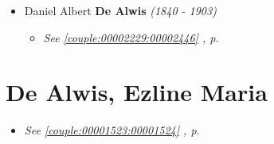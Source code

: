 \documentclass[10pt, openany]{book}
\begin{document}
\begin{itemize}
{\begin{itemize}
{\begin{itemize}
{\begin{itemize}
{\begin{itemize}
{\begin{itemize}
{\begin{itemize}
{\begin{itemize}
{\begin{itemize}
\end{itemize}
  }
\item{Sunil \textbf{De Livera} \textcolor{gray}{\textit{(b. 195?)}}
  }
\item{Jagath Manjula \textbf{De Livera} \textcolor{gray}{\textit{(b. 195?)}}
\begin{itemize}
\item{\textit{m.} Lakshmi \textbf{Aulanandam} \textcolor{gray}{\textit{(b. 196?)}}   \label{couple:00001263:00001264} \begin{itemize}
\item{Rahul \textbf{De Livera} \textcolor{gray}{\textit{(b. 198?)}}
  }
\item{Shruti \textbf{De Livera} \textcolor{gray}{\textit{(b. 199?)}}
  }
\end{itemize}}
\end{itemize}
   }
\end{itemize}}
\end{itemize}
 }
\end{itemize}}
\end{itemize}
 }
\end{itemize}}
\end{itemize}
   }
\item{Daniel Albert \textbf{De Alwis} \textcolor{slorange}{\textit{(1840 - 1903)}}
\begin{itemize}
\item{\textcolor{slteal}{\textit{See  \autoref{couple:00002229:00002446} \textit{, p. \pageref{couple:00002229:00002446} }}}}
\end{itemize}
   }
\end{itemize}}
\end{itemize}
   
\chapter{De Alwis, Ezline Maria}
\label{00001523}
\textcolor{slmaroon}{\textit{}}
\begin{itemize}
\item{\textcolor{slteal}{\textit{See  \autoref{couple:00001523:00001524} \textit{, p. \pageref{couple:00001523:00001524} }}}}
\end{itemize}
   
\end{document}
